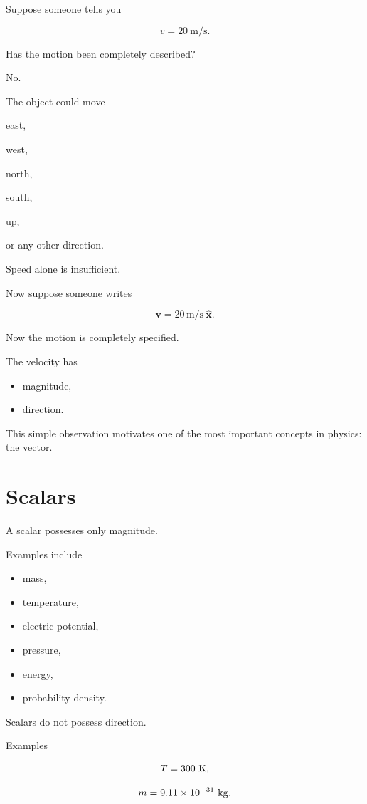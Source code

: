 \documentclass[11pt,a4paper,openany]{book}
\begin{document}
Suppose someone tells you

\[
v=20\ \mathrm{m/s}.
\]

Has the motion been completely described?

No.

The object could move

east,

west,

north,

south,

up,

or any other direction.

Speed alone is insufficient.

Now suppose someone writes

\[
\mathbf v=
20\,\mathrm{m/s}
\ \hat{\mathbf x}.
\]

Now the motion is completely specified.

The velocity has

\begin{itemize}
	\item magnitude,
	\item direction.
\end{itemize}

This simple observation motivates one of the most important concepts in
physics: the vector.


\section{Scalars}

A scalar possesses only magnitude.

Examples include

\begin{itemize}
	\item mass,
	\item temperature,
	\item electric potential,
	\item pressure,
	\item energy,
	\item probability density.
\end{itemize}

Scalars do not possess direction.

Examples

\[
T=300\ {\rm K},
\]

\[
m=9.11\times10^{-31}\ {\rm kg}.
\]
\end{document}
